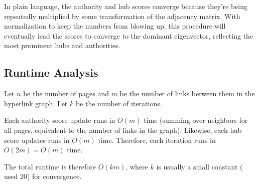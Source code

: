 \documentclass[11pt]{article}
\begin{document}
In plain language, the authority and hub scores converge because they're being repeatedly multiplied by some transformation of the adjacency matrix.
With normalization to keep the numbers from blowing up, this procedure will eventually lead the scores to converge to the dominant eigenvector, reflecting the most prominent hubs and authorities.

\subsection{Runtime Analysis}
Let $n$ be the number of pages and $m$ be the number of links between them in the hyperlink graph. Let $k$ be the number of iterations.

Each authority score update runs in $O(m)$ time (summing over neighbors for all pages, equivalent to the number of links in the graph).
Likewise, each hub score updates runs in $O(m)$ time.
Therefore, each iteration runs in $O(2m) = O(m)$ time.

The total runtime is therefore $O(km)$, where $k$ is usually a small constant (\textcite{kleinberg_authoritative_1999} used 20) for convergence.
\end{document}
